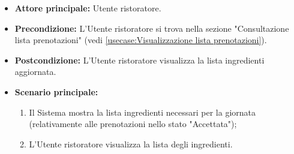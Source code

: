\label{usecase:Consultazione lista ingredienti}
\begin{itemize}

	\item \textbf{Attore principale:} Utente ristoratore.

	\item \textbf{Precondizione:} L'Utente ristoratore si trova nella sezione "Consultazione lista prenotazioni" (vedi \autoref{usecase:Visualizzazione lista prenotazioni}).

	\item \textbf{Postcondizione:} L'Utente ristoratore visualizza la lista ingredienti aggiornata.

	\item \textbf{Scenario principale:}
	      \begin{enumerate}
		      \item Il Sistema mostra la lista ingredienti necessari per la giornata (relativamente alle prenotazioni nello stato "Accettata");
		      \item L'Utente ristoratore visualizza la lista degli ingredienti.
	      \end{enumerate}

\end{itemize}

